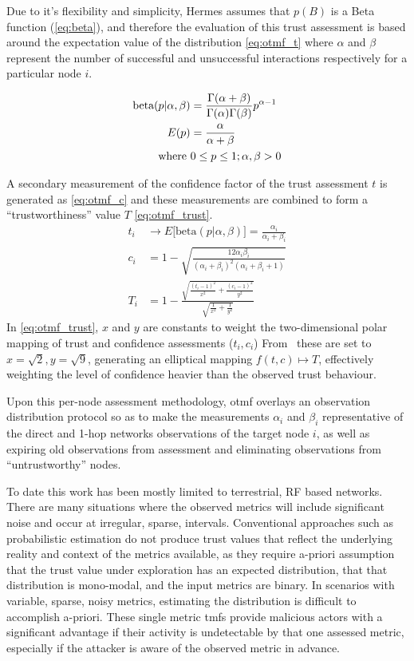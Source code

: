 Due to it's flexibility and simplicity, Hermes assumes that $p(B)$ is a Beta function (\eqref{eq:beta}), and therefore the evaluation of this trust assessment is based around the expectation value of the distribution \eqref{eq:otmf_t}  where $\alpha$ and $\beta$ represent the number of successful and unsuccessful interactions respectively for a particular node $i$.

\begin{align}
  \label{eq:beta}
  \text{beta}(p|\alpha,\beta) &= \frac{\Gamma(\alpha + \beta)}{\Gamma(\alpha)\Gamma(\beta)}p^{\alpha-1}\\
  \label{eq:beta_e}
  E(p) &= \frac{\alpha}{\alpha + \beta}\\
  \text{where } &0 \leq p \leq 1; \alpha,\beta > 0 \notag
\end{align}
%

A secondary measurement of the confidence factor of the trust assessment $t$ is generated as \eqref{eq:otmf_c} and these measurements are combined to form a ``trustworthiness'' value $T$ \eqref{eq:otmf_trust}.
%
\begin{align}
  t_i &\to E\lbrack\text{beta}(p|\alpha,\beta)\rbrack = \frac{\alpha_i}{\alpha_i+\beta_i} \label{eq:otmf_t}\\[5pt]
  c_i &= 1 - \sqrt{\frac{12\alpha_i\beta_i}{(\alpha_i+\beta_i)^2(\alpha_i+\beta_i+1)}} \label{eq:otmf_c}\\[5pt]
  T_i &= 1 - \frac{\sqrt{\frac{(t_i-1)^2}{x^2} + \frac{(c_i-1)^2}{y^2}}}{\sqrt{\frac{1}{x^2}+\frac{1}{y^2}}} \label{eq:otmf_trust}
\end{align}
%
In \eqref{eq:otmf_trust}, $x$ and $y$ are constants to weight the two-dimensional polar mapping of trust and confidence assessments ($t_i,c_i$)
From~\citet{Zouridaki2005} these are set to $x=\sqrt{2},y=\sqrt{9}$, generating an elliptical mapping $f(t,c) \mapsto T$, effectively weighting the level of confidence heavier than the observed trust behaviour.

Upon this per-node assessment methodology, \gls{otmf} overlays an observation distribution protocol so as to make the measurements $\alpha_i$ and $\beta_i$ representative of the direct and 1-hop networks observations of the target node $i$, as well as expiring old observations from assessment and eliminating observations from ``untrustworthy'' nodes.



To date this work has been mostly limited to terrestrial, RF based networks.
There are many situations where the observed metrics will include significant noise and occur at irregular, sparse, intervals.
Conventional approaches such as probabilistic estimation do not produce trust values that reflect the underlying reality and context of the metrics available, as they require a-priori assumption that the trust value under exploration has an expected distribution, that that distribution is mono-modal, and the input metrics are binary.
In scenarios with variable, sparse, noisy metrics, estimating the distribution is difficult to accomplish a-priori.
These single metric \glspl{tmf} provide malicious actors with a significant advantage if their activity is undetectable by that one assessed metric, especially if the attacker is aware of the observed metric in advance.

